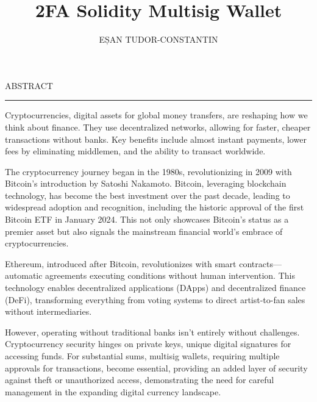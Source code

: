 \documentclass[12pt]{report}
\begin{document}
\title{2FA Solidity Multisig Wallet}					   
\author{EȘAN TUDOR-CONSTANTIN}											
				
\maketitle

\newpage
\thispagestyle{empty}
\mbox{}
\newpage
{} 

\cleardoublepage
ABSTRACT
\vspace{0.5cm}	
\hrule
\vspace{0.5cm}	

\par Cryptocurrencies, digital assets for global money transfers, are reshaping how we think about finance. They use decentralized networks, allowing for faster, cheaper transactions without banks. Key benefits include almost instant payments, lower fees by eliminating middlemen, and the ability to transact worldwide.

\par The cryptocurrency journey began in the 1980s, revolutionizing in 2009 with Bitcoin's introduction by Satoshi Nakamoto. Bitcoin, leveraging blockchain technology, has become the best investment over the past decade, leading to widespread adoption and recognition, including the historic approval of the first Bitcoin ETF in January 2024. This not only showcases Bitcoin's status as a premier asset but also signals the mainstream financial world's embrace of cryptocurrencies.

\par Ethereum, introduced after Bitcoin, revolutionizes with smart contracts—automatic agreements executing conditions without human intervention. This technology enables decentralized applications (DApps) and decentralized finance (DeFi), transforming everything from voting systems to direct artist-to-fan sales without intermediaries.

\par However, operating without traditional banks isn't entirely without challenges. Cryptocurrency security hinges on private keys, unique digital signatures for accessing funds. For substantial sums, multisig wallets, requiring multiple approvals for transactions, become essential, providing an added layer of security against theft or unauthorized access, demonstrating the need for careful management in the expanding digital currency landscape.
\end{document}
